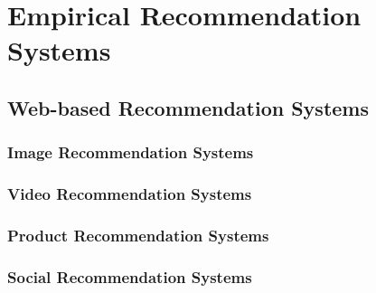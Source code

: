 %
%
%
\chapter{Empirical Recommendation Systems}
\label{intro} %

\section{Web-based Recommendation Systems}
\subsection{Image Recommendation Systems}
\subsection{Video Recommendation Systems}
\subsection{Product Recommendation Systems}
\subsection{Social Recommendation Systems}



